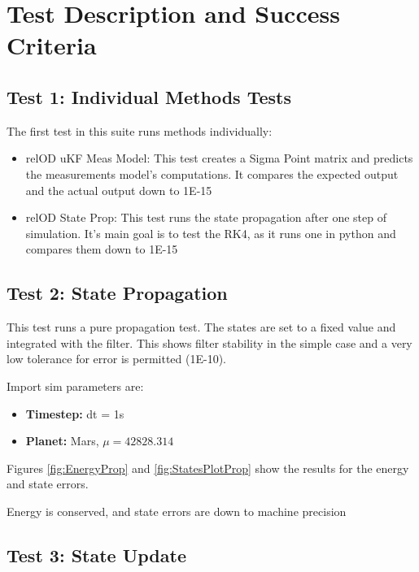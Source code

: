
\newpage

\section{Test Description and Success Criteria}

\subsection{Test 1: Individual Methods Tests}

The first test in this suite runs methods individually:

\begin{itemize}
\item{relOD uKF Meas Model:} This test creates a Sigma Point matrix and predicts the measurements model's computations. It compares the expected output and the actual output down to 1E-15 
\item{relOD State Prop:} This test runs the state propagation after one step of simulation. It's main goal is to test the RK4, as it runs one in python and compares them down to 1E-15
\end{itemize}


\subsection{Test 2: State Propagation}

This test runs a pure propagation test. The states are set to a fixed value and integrated with the filter.
This shows filter stability in the simple case and a very low tolerance for error is permitted (1E-10). 

Import sim parameters are:
\begin{itemize}
\item \textbf{Timestep:} dt = 1s
\item \textbf{Planet:} Mars, $\mu = 42828.314$
\end{itemize}

Figures \ref{fig:EnergyProp} and \ref{fig:StatesPlotProp} show the results for the energy and state errors. 
 
 
 
Energy is conserved, and state errors are down to machine precision
 
\subsection{Test 3: State Update}

